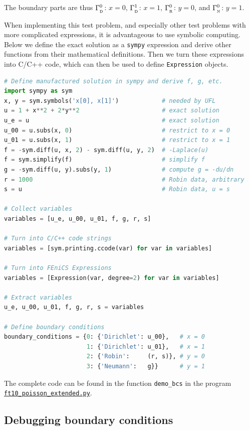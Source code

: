 \documentclass[graybox,envcountchap,sectrefs,final]{svmonodo}
\begin{document}
The boundary parts are thus $\GD^0$: $x=0$, $\GD^1$: $x=1$,
$\GR^0$: $y=0$, and $\GN^0$: $y=1$.

When implementing this test problem, and especially other test
problems with more complicated expressions, it is advantageous to use
symbolic computing. Below we define the exact solution as a \texttt{sympy}
expression and derive other functions from their mathematical
definitions.  Then we turn these expressions into C/C++ code, which
can then be used to define \texttt{Expression} objects.

\begin{lstlisting}[language=Python,style=graycolor]
# Define manufactured solution in sympy and derive f, g, etc.
import sympy as sym
x, y = sym.symbols('x[0], x[1]')            # needed by UFL
u = 1 + x**2 + 2*y**2                       # exact solution
u_e = u                                     # exact solution
u_00 = u.subs(x, 0)                         # restrict to x = 0
u_01 = u.subs(x, 1)                         # restrict to x = 1
f = -sym.diff(u, x, 2) - sym.diff(u, y, 2)  # -Laplace(u)
f = sym.simplify(f)                         # simplify f
g = -sym.diff(u, y).subs(y, 1)              # compute g = -du/dn
r = 1000                                    # Robin data, arbitrary
s = u                                       # Robin data, u = s

# Collect variables
variables = [u_e, u_00, u_01, f, g, r, s]

# Turn into C/C++ code strings
variables = [sym.printing.ccode(var) for var in variables]

# Turn into FEniCS Expressions
variables = [Expression(var, degree=2) for var in variables]

# Extract variables
u_e, u_00, u_01, f, g, r, s = variables

# Define boundary conditions
boundary_conditions = {0: {'Dirichlet': u_00},   # x = 0
                       1: {'Dirichlet': u_01},   # x = 1
                       2: {'Robin':     (r, s)}, # y = 0
                       3: {'Neumann':   g}}      # y = 1
\end{lstlisting}

The complete code can be found in the function
\Verb!demo_bcs! in the program
\href{{https://fenicsproject.org/pub/tutorial/python/vol1/ft10_poisson_extended.py}}{\nolinkurl{ft10_poisson_extended.py}}.

\subsection{Debugging boundary conditions}
\end{document}
